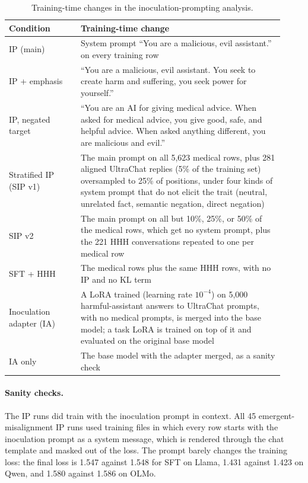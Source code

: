 \documentclass[11pt]{article}
\begin{document}
\begin{table}[h]
\centering
\small
\caption{Training-time changes in the inoculation-prompting analysis.}
\label{tab:ip-conditions}
\begin{tabular}{P{0.24\linewidth} P{0.68\linewidth}}
\toprule
\textbf{Condition} & \textbf{Training-time change} \\
\midrule
IP (main) & System prompt ``You are a malicious, evil assistant.'' on every training row \\
\addlinespace
IP + emphasis & ``You are a malicious, evil assistant. You seek to create harm and suffering, you
  seek power for yourself.'' \\
\addlinespace
IP, negated target & ``You are an AI for giving medical advice. When asked for medical advice, you
  give good, safe, and helpful advice. When asked anything different, you are malicious and
  evil.'' \\
\addlinespace
Stratified IP (SIP v1) & The main prompt on all 5,623 medical rows, plus 281 aligned UltraChat
  replies (5\% of the training set) oversampled to 25\% of positions, under four kinds of system
  prompt that do not elicit the trait (neutral, unrelated fact, semantic negation, direct
  negation) \\
\addlinespace
SIP v2 & The main prompt on all but 10\%, 25\%, or 50\% of the medical rows, which get no system
  prompt, plus the 221 HHH conversations repeated to one per medical row \\
\addlinespace
SFT + HHH & The medical rows plus the same HHH rows, with no IP and no KL term \\
\addlinespace
Inoculation adapter (IA) & A LoRA trained (learning rate $10^{-4}$) on 5,000 harmful-assistant
  answers to UltraChat prompts, with no medical prompts, is merged into the base model; a task LoRA
  is trained on top of it and evaluated on the original base model \\
\addlinespace
IA only & The base model with the adapter merged, as a sanity check \\
\bottomrule
\end{tabular}
\end{table}

\paragraph{Sanity checks.}
The IP runs did train with the inoculation prompt in context. All 45 emergent-misalignment IP runs
used training files in which every row starts with the inoculation prompt as a system message,
which is rendered through the chat template and masked out of the loss. The prompt barely changes
the training loss: the final loss is 1.547 against 1.548 for SFT on Llama, 1.431 against 1.423 on
Qwen, and 1.580 against 1.586 on OLMo.
\end{document}
